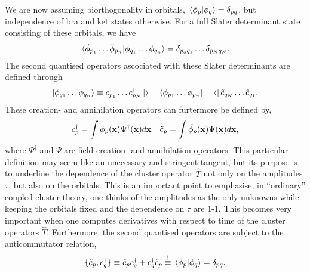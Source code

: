 We are now assuming biorthogonality in orbitals, $\braket*{\tilde{\phi}_p}{\phi_q} = \delta_{pq}$, but 
independence of bra and ket states otherwise. For a full Slater determinant state 
consisting of these orbitals, we have 
\begin{equation}
    \braket*{\tilde{\phi}_{p_1}\dots \tilde{\phi}_{p_n}}{\phi_{q_1}\dots\phi_{q_n}}
    =\delta_{p_q q_1}\dots \delta_{p_N q_N}.
\end{equation}
The second quantised operators ascociated with these Slater determinants are defined through
\begin{equation}
    \ket{\phi_{q_1}\dots\phi_{q_n}} \equiv c^\dagger_{p_1}\dots c^\dagger_{p_N}\ket{ }
    \quad
    \bra*{\tilde{\phi}_{p_1}\dots \tilde{\phi}_{p_n}} = \bra{ } \tilde{c}_{q_N} \dots \tilde{c}_{q_1}.
\end{equation}
These creation- and annihilation operators can furtermore be defined by,
\begin{equation}
    c_p^\dagger = \int \phi_p(\vb{x}) \Psi^\dagger(\vb{x})d\vb{x}
    \quad
    \tilde{c}_p = \int \tilde{\phi}_p(\vb{x}) \Psi(\vb{x})d\vb{x},
\end{equation}
where $\Psi^\dagger$ and $\Psi$ are field creation- and annihilation operators. This particular
definition may seem like an unecessary and stringent tangent, but its purpose is to underline
the dependence of the cluster operator $\hat{T}$ not only on the amplitudes
$\tau$, but also on the orbitals. This is an important point to emphasise, in ``ordinary''
coupled cluster theory, one thinks of the amplitudes as the only unknowns while keeping the 
orbitals fixed and the dependence on $\tau$ are 1-1. This becomes very important when one computes derivatives with 
respect to time of the cluster operators $\hat{T}$.
Furthermore, the second quantised operators are subject to the anticommutator relation,
\begin{equation}
    \{\tilde{c}_p, c_q^\dagger \} \equiv \tilde{c}_p c_q^\dagger + c_q^\dagger\tilde{c}_p
    \stackrel{!}{\equiv} \braket*{\tilde{\phi}_p}{\phi_q} = \delta_{pq}.
\end{equation}

